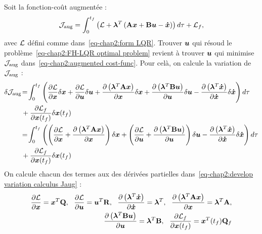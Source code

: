 Soit la fonction-coût augmentée : 
\begin{equation}\label{eq-chap2:augmented cost-func}
	{\cal J}_{\rm aug}=\int_0^{t_f}\left({\cal L} +\boldsymbol{\lambda}^T\left(\mathbf{A}\bm{x}+\mathbf{B}\bm{u}-\bm{\dot{x}}\right)\right)d\tau + {\cal L}_f,
\end{equation}
avec ${\cal L}$ défini comme dans~\eqref{eq-chap2:form LQR}. Trouver $\bm{u}$ qui résoud le problème~\eqref{eq-chap2:FH-LQR optimal problem} revient à trouver $\bm{u}$ qui minimise ${\cal J}_{\rm aug}$ dans~\eqref{eq-chap2:augmented cost-func}. Pour celà, on calcule la variation de ${\cal J}_{\rm aug}$ : 
\begin{align}\label{eq-chap2:develop variation calculus Jaug}
	\begin{split}
		\delta{\cal J}_{\rm aug} &\!=\! \int_0^{t_f}\left(\frac{\partial {\cal L}}{\partial \bm{x}}\delta\bm{x} + \frac{\partial {\cal L}}{\partial \bm{u}}\delta\bm{u} + \frac{\partial\left(\boldsymbol{\lambda}^T\mathbf{A}\bm{x}\right)}{\partial \bm{x}}\delta\bm{x} + \frac{\partial\left(\boldsymbol{\lambda}^T\mathbf{B}\bm{u}\right)}{\partial \bm{u}}\delta\bm{u} - \frac{\partial\left(\boldsymbol{\lambda}^T\bm{\dot{x}}\right)}{\partial \bm{\dot{x}}}\delta\bm{\dot{x}}\right)d\tau  \\&+
		\frac{\partial{\cal L}_f}{\partial \bm{x}(t_f)}\delta\bm{x}(t_f) \\
		&\!=\! \int_0^{t_f}\left(\left(\frac{\partial {\cal L}}{\partial \bm{x}} + \frac{\partial\left(\boldsymbol{\lambda}^T\mathbf{A}\bm{x}\right)}{\partial \bm{x}}\right)\delta\bm{x} + \left(\frac{\partial {\cal L}}{\partial \bm{u}} + \frac{\partial\left(\boldsymbol{\lambda}^T\mathbf{B}\bm{u}\right)}{\partial \bm{u}}\right)\delta\bm{u} - \frac{\partial\left(\boldsymbol{\lambda}^T\bm{\dot{x}}\right)}{\partial \bm{\dot{x}}}\delta\bm{\dot{x}}\right)d\tau  \\&+
		\frac{\partial{\cal L}_f}{\partial \bm{x}(t_f)}\delta\bm{x}(t_f) 
	\end{split}
\end{align}
On calcule chacun des termes aux des dérivées partielles dans~\eqref{eq-chap2:develop variation calculus Jaug} : 
\begin{align}\label{eq-chap2:calcul partial derivative in Jaug}
	\begin{split}
		\frac{\partial {\cal L}}{\partial \state} = \state^T\matriceQ, \ \ \frac{\partial {\cal L}}{\partial \command} = \command^T\matriceR, \ \ \frac{\partial\left(\boldsymbol{\lambda}^T\stateDot\right)}{\partial \stateDot} =\boldsymbol{\lambda}^T, \ \ \frac{\partial\left(\boldsymbol{\lambda}^T\matriceA\state\right)}{\partial \state} = \boldsymbol{\lambda}^T\matriceA, \\ \frac{\partial\left(\boldsymbol{\lambda}^T\matriceB\command\right)}{\partial \command} = \boldsymbol{\lambda}^T\matriceB, \ \ \frac{\partial{\cal L}_f}{\partial \state(t_f)} = \state^T(t_f)\matriceQ_f
	\end{split}
\end{align}

